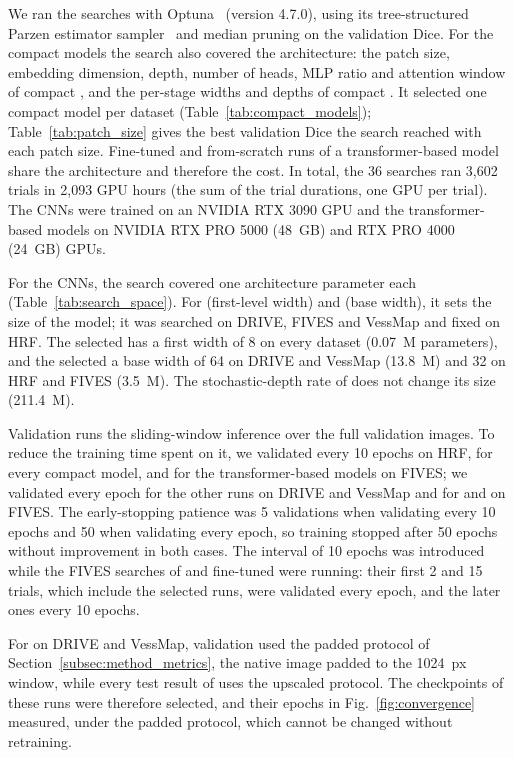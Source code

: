 We ran the searches with Optuna~\cite{akiba2019optuna} (version 4.7.0), using its tree-structured Parzen estimator sampler~\cite{bergstra2011algorithms} and median pruning on the validation Dice. For the compact models the search also covered the architecture: the patch size, embedding dimension, depth, number of heads, MLP ratio and attention window of compact \medsam{}, and the per-stage widths and depths of compact \litemedsam{}. It selected one compact model per dataset (Table~\ref{tab:compact_models}); Table~\ref{tab:patch_size} gives the best validation Dice the search reached with each patch size. Fine-tuned and from-scratch runs of a transformer-based model share the architecture and therefore the cost. In total, the 36 searches ran 3,602 trials in 2,093 GPU hours (the sum of the trial durations, one GPU per trial). The CNNs were trained on an NVIDIA RTX 3090 GPU and the transformer-based models on NVIDIA RTX PRO 5000 (48~GB) and RTX PRO 4000 (24~GB) GPUs.

For the CNNs, the search covered one architecture parameter each (Table~\ref{tab:search_space}). For \lwnet{} (first-level width) and \convunext{} (base width), it sets the size of the model; it was searched on DRIVE, FIVES and VessMap and fixed on HRF. The selected \lwnet{} has a first width of 8 on every dataset (0.07~M parameters), and the selected \convunext{} a base width of 64 on DRIVE and VessMap (13.8~M) and 32 on HRF and FIVES (3.5~M). The stochastic-depth rate of \convnext{} does not change its size (211.4~M).

Validation runs the sliding-window inference over the full validation images. To reduce the training time spent on it, we validated every 10 epochs on HRF, for every compact model, and for the transformer-based models on FIVES; we validated every epoch for the other runs on DRIVE and VessMap and for \lwnet{} and \convunext{} on FIVES. The early-stopping patience was 5 validations when validating every 10 epochs and 50 when validating every epoch, so training stopped after 50 epochs without improvement in both cases. The interval of 10 epochs was introduced while the FIVES searches of \convnext{} and fine-tuned \litemedsam{} were running: their first 2 and 15 trials, which include the selected runs, were validated every epoch, and the later ones every 10 epochs.

For \medsam{} on DRIVE and VessMap, validation used the padded protocol of Section~\ref{subsec:method_metrics}, the native image padded to the 1024~px window, while every test result of \medsam{} uses the upscaled protocol. The checkpoints of these runs were therefore selected, and their epochs in Fig.~\ref{fig:convergence} measured, under the padded protocol, which cannot be changed without retraining.

